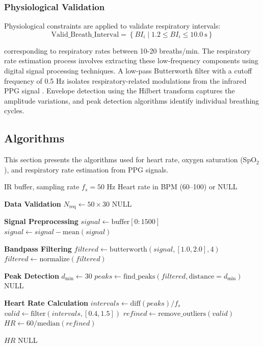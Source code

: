 \documentclass{ieeeaccess}
\begin{document}
\subsubsection{Physiological Validation}
Physiological constraints are applied to validate respiratory intervals:
\begin{equation}
\text{Valid\_Breath\_Interval}
=
\left\{ BI_i \mid 1.2 \leq BI_i \leq 10.0~\text{s} \right\}
\end{equation}


corresponding to respiratory rates between 10-20 breaths/min.
The respiratory rate estimation process involves extracting these low-frequency components using digital signal processing techniques. A low-pass Butterworth filter with a cutoff frequency of 0.5 Hz isolates respiratory-related modulations from the infrared PPG signal \cite{b20}. Envelope detection using the Hilbert transform captures the amplitude variations, and peak detection algorithms identify individual breathing cycles.

\subsection{Algorithms}
This section presents the algorithms used for heart rate, oxygen saturation (SpO$_2$),
and respiratory rate estimation from PPG signals.
\begin{algorithm}[!t]
\caption{Heart Rate Calculation from PPG Signal}
\label{alg:heart_rate}
\footnotesize
\begin{algorithmic}[1]
\Require IR buffer, sampling rate $f_s = 50$ Hz
\Ensure Heart rate in BPM (60--100) or NULL

\Statex \textbf{Data Validation}
\State $N_{\text{req}} \gets 50 \times 30$
    \State \Return NULL
\EndIf

\Statex \textbf{Signal Preprocessing}
\State $signal \gets \text{buffer}[0{:}1500]$
\State $signal \gets signal - \text{mean}(signal)$

\Statex \textbf{Bandpass Filtering}
\State $filtered \gets \text{butterworth}(signal,[1.0,2.0],4)$
\State $filtered \gets \text{normalize}(filtered)$

\Statex \textbf{Peak Detection}
\State $d_{\min} \gets 30$
\State $peaks \gets \text{find\_peaks}(filtered,\text{distance}=d_{\min})$
    \State \Return NULL
\EndIf

\Statex \textbf{Heart Rate Calculation}
\State $intervals \gets \text{diff}(peaks)/f_s$
\State $valid \gets \text{filter}(intervals,[0.4,1.5])$
\State $refined \gets \text{remove\_outliers}(valid)$
\State $HR \gets 60/\text{median}(refined)$

    \State \Return $HR$
\Else
    \State \Return NULL
\EndIf
\end{algorithmic}
\end{algorithm}
\end{document}
